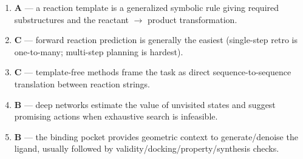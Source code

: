 \documentclass[11pt,oneside]{article}
\begin{document}
\begin{enumerate}[label=\textbf{Q\arabic*.}, leftmargin=3em, itemsep=4pt]
  \item \textbf{A} --- a reaction template is a generalized symbolic rule giving required substructures and the reactant $\to$ product transformation.
  \item \textbf{C} --- forward reaction prediction is generally the easiest (single-step retro is one-to-many; multi-step planning is hardest).
  \item \textbf{C} --- template-free methods frame the task as direct sequence-to-sequence translation between reaction strings.
  \item \textbf{B} --- deep networks estimate the value of unvisited states and suggest promising actions when exhaustive search is infeasible.
  \item \textbf{B} --- the binding pocket provides geometric context to generate/denoise the ligand, usually followed by validity/docking/property/synthesis checks.
\end{enumerate}
\end{document}
